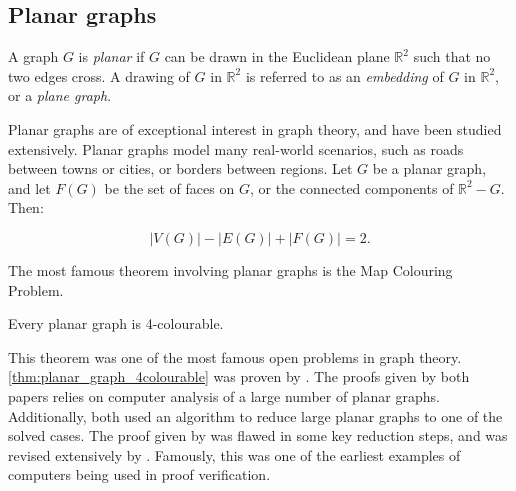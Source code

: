 \subsection{Planar graphs}
A graph \(G\) is \textit{planar} if \(G\) can be drawn in the Euclidean plane \( \mathbb{R}^2 \) such that no two edges cross. A drawing of $G$ in $\mathbb{R}^2$ is referred to as an \textit{embedding} of $G$ in $\mathbb{R}^2$, or a \textit{plane graph}. 

Planar graphs are of exceptional interest in graph theory, and have been studied extensively. Planar graphs model many real-world scenarios, such as roads between towns or cities, or borders between regions.
Let $G$ be a planar graph, and let $F(G)$ be the set of faces on $G$, or the connected components of $\mathbb{R}^2 - G$. Then:
\begin{theorem}
	\begin{equation}
		|V(G)| - |E(G)| + |F(G)| = 2. 
	\end{equation}
\end{theorem}

The most famous theorem involving planar graphs is the Map Colouring Problem.
\begin{theorem}\label{thm:planar_graph_4colourable}
	Every planar graph is 4-colourable. 
\end{theorem}
This theorem was one of the most famous open problems in graph theory.
\cref{thm:planar_graph_4colourable} was proven by \textcite{appelEveryPlanarMap1989,robertsonEfficientlyFourcoloringPlanar1996}. The proofs given by both papers relies on computer analysis of a large number of planar graphs. Additionally, both used an algorithm to reduce large planar graphs to one of the solved cases. The proof given by \textcite{appelEveryPlanarMap1989} was flawed in some key reduction steps, and was revised extensively by \textcite{robertsonEfficientlyFourcoloringPlanar1996}. Famously, this was one of the earliest examples of computers being used in proof verification.
